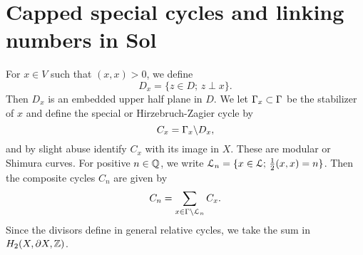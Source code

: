 \section{Capped special cycles and linking numbers in Sol}\label{capped-cycles}

For $x \in V$ such that $(x,x)>0$, we define 
\[
D_x =\{ z \in D; \, z \perp x \}.
\]
Then $D_x$ is an embedded upper half plane in $D$. We let $\Gamma_x \subset \Gamma$ be the stabilizer of $x$ and define the special or Hirzebruch-Zagier cycle by 
\[
C_x = \Gamma_x \backslash D_x, 
\]
and by slight abuse identify $C_x$ with its image in $X$. These are modular or Shimura curves. For positive $n \in \mathbb{Q}$, we write $\mathcal{L}_n = \{ x \in \mathcal{L}; \, \tfrac12(x,x)= n\}$. Then the composite cycles $C_n$ are given by
\[
C_n= \sum_{x \in \Gamma \backslash \mathcal{L}_n} C_x.
\]
Since the divisors define in general relative cycles, we take the sum in $H_2(X,\partial X,\mathbb{Z})$. 


\vskip 0.5in


